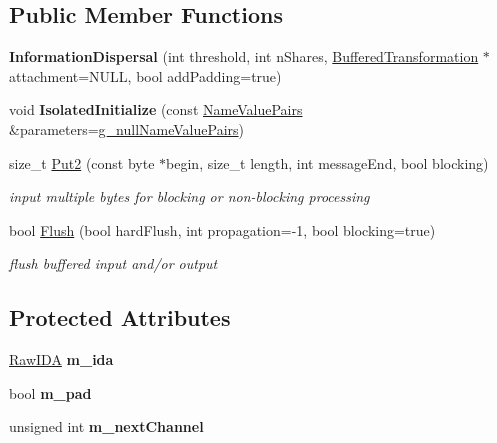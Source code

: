 \subsection*{Public Member Functions}
\begin{DoxyCompactItemize}
\item 
\hypertarget{class_information_dispersal_a40e812ee9251c018efe7bff39e812efe}{
{\bfseries InformationDispersal} (int threshold, int nShares, \hyperlink{class_buffered_transformation}{BufferedTransformation} $\ast$attachment=NULL, bool addPadding=true)}
\label{class_information_dispersal_a40e812ee9251c018efe7bff39e812efe}

\item 
\hypertarget{class_information_dispersal_a3901bdfb5959c2ee901bd3a5fe1c161a}{
void {\bfseries IsolatedInitialize} (const \hyperlink{class_name_value_pairs}{NameValuePairs} \&parameters=\hyperlink{cryptlib_8h_ab1b0f7d11a21c6163be8ca2662ce2ac6}{g\_\-nullNameValuePairs})}
\label{class_information_dispersal_a3901bdfb5959c2ee901bd3a5fe1c161a}

\item 
size\_\-t \hyperlink{class_information_dispersal_a0dd51a1bdc83cea84cd72218730f4744}{Put2} (const byte $\ast$begin, size\_\-t length, int messageEnd, bool blocking)
\begin{DoxyCompactList}\small\item\em input multiple bytes for blocking or non-\/blocking processing \item\end{DoxyCompactList}\item 
bool \hyperlink{class_information_dispersal_aa348e2dd4609c563196f89e1cf2ad35c}{Flush} (bool hardFlush, int propagation=-\/1, bool blocking=true)
\begin{DoxyCompactList}\small\item\em flush buffered input and/or output \item\end{DoxyCompactList}\end{DoxyCompactItemize}
\subsection*{Protected Attributes}
\begin{DoxyCompactItemize}
\item 
\hypertarget{class_information_dispersal_afd962aac086ce5c3fbf16157d59e4e63}{
\hyperlink{class_raw_i_d_a}{RawIDA} {\bfseries m\_\-ida}}
\label{class_information_dispersal_afd962aac086ce5c3fbf16157d59e4e63}

\item 
\hypertarget{class_information_dispersal_afc464de54c9d574c9bff3d674907fd42}{
bool {\bfseries m\_\-pad}}
\label{class_information_dispersal_afc464de54c9d574c9bff3d674907fd42}

\item 
\hypertarget{class_information_dispersal_a4bd5ab80c6221a3274033470cbc83620}{
unsigned int {\bfseries m\_\-nextChannel}}
\label{class_information_dispersal_a4bd5ab80c6221a3274033470cbc83620}

\end{DoxyCompactItemize}


